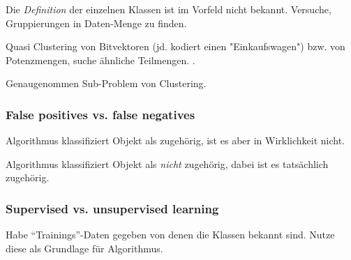 \documentclass[10pt]{article} %
\begin{document}
\begin{definition}[Clustering] Die \textit{Definition} der einzelnen Klassen ist im Vorfeld nicht bekannt. Versuche, Gruppierungen in Daten-Menge zu finden.
\end{definition}

\begin{definition} Quasi Clustering von Bitvektoren (jd. kodiert einen "Einkaufswagen") bzw. von Potenzmengen, suche ähnliche Teilmengen. .
\end{definition}

\begin{definition} 
       Genaugenommen Sub-Problem von Clustering. 
\end{definition} 

\subsubsection{False positives vs. false negatives}

\begin{definition} 
    Algorithmus klassifiziert Objekt als zugehörig, ist es aber in Wirklichkeit nicht.
\end{definition} 

\begin{definition} 
       Algorithmus klassifiziert Objekt als \textit{nicht} zugehörig, dabei ist es tatsächlich zugehörig.
\end{definition} 

\subsubsection{Supervised vs. unsupervised learning}

\begin{definition} 
    Habe ``Trainings''-Daten gegeben von denen die Klassen bekannt sind. Nutze
    diese als Grundlage für Algorithmus. 
\end{definition} 
\end{document}
